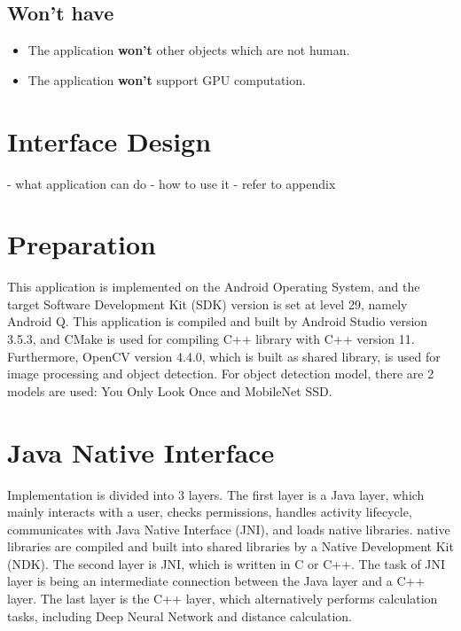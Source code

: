         \subsection{Won't have}
            \begin{itemize}
                \item The application \textbf{won't} other objects which are not human.
                \item The application \textbf{won't} support GPU computation.
            \end{itemize}

    \section{Interface Design}
        - what application can do
        - how to use it
        - refer to appendix

    \section{Preparation}
        This application is implemented on the Android Operating System,
        and the target Software Development Kit (SDK) version is set at level 29, namely Android Q.
        This application is compiled and built by Android Studio version 3.5.3,
        and CMake is used for compiling C++ library with C++ version 11.
        Furthermore, OpenCV version 4.4.0, which is built as shared library, is used for image processing and object detection.
        For object detection model, there are 2 models are used: You Only Look Once and MobileNet SSD.

    \section{Java Native Interface}
        Implementation is divided into 3 layers.
            The first layer is a Java layer, which mainly interacts with a user,
            checks permissions, handles activity lifecycle, communicates with Java Native Interface (JNI), and loads native libraries.
                native libraries are compiled and built into shared libraries by a Native Development Kit (NDK).
            The second layer is JNI, which is written in C or C++.
                The task of JNI layer is being an intermediate connection between the Java layer and a C++ layer.
            The last layer is the C++ layer, which alternatively performs calculation tasks,
            including Deep Neural Network and distance calculation.

